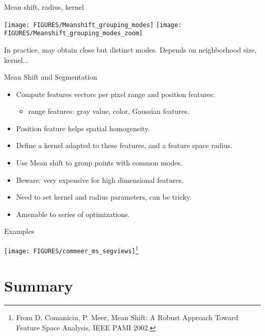 \documentclass[9pt]{beamer}
\begin{document}
\begin{frame}{Mean shift, radius, kernel}
 \begin{center}
    \texttt{[image: FIGURES/Meanshift\_grouping\_modes]}\hfill
    \texttt{[image: FIGURES/Meanshift\_grouping\_modes\_zoom]}\\
  \end{center}
  In practice, may obtain close but distinct modes. Depends on neighborhood size, kernel...
\end{frame}


\begin{frame}{Mean Shift and Segmentation}
  \begin{itemize}
  \item Compute features vectors per pixel range and position features: 
    \begin{itemize}
    \item range features: gray value, color, Gaussian features.
    \end{itemize}
  \item Position feature helps spatial homogeneity.
  \item Define a kernel adapted to these features, and a feature space radius.
  \item Use Mean shift to group points with common modes.  
  \item Beware: very expensive for high dimensional features.
  \item Need to set kernel and radius parameters, can be tricky.
  \item Amenable to series of optimizations.
    
  \end{itemize}  
\end{frame}


\begin{frame}{Examples}
  \begin{center}
    \texttt{[image: FIGURES/commeer\_ms\_segviews]}\footnote{From
    D. Comaniciu, P. Meer, Mean Shift: A Robust Approach Toward
    Feature Space Analysis, IEEE PAMI 2002.}
  \end{center}
\end{frame}

\section{Summary}
\end{document}
